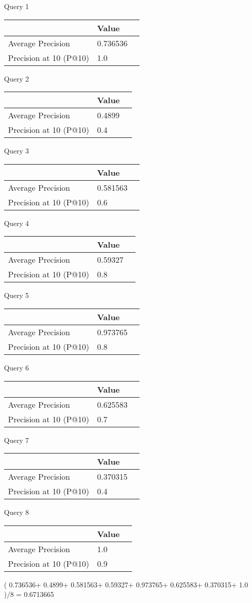 
Query 1
\begin{tabular}{lll}
\toprule
{} &     Value \\
\midrule
Average Precision &  0.736536 \\
Precision at 10 (P@10) &       1.0 \\
\bottomrule
\end{tabular}

Query 2
\begin{tabular}{lll}
\toprule
{} &   Value \\
\midrule
Average Precision &  0.4899 \\
Precision at 10 (P@10) &     0.4 \\
\bottomrule
\end{tabular}

Query 3
\begin{tabular}{lll}
\toprule
{} &     Value \\
\midrule
Average Precision &  0.581563 \\
Precision at 10 (P@10) &       0.6 \\
\bottomrule
\end{tabular}

Query 4
\begin{tabular}{lll}
\toprule
{} &    Value \\
\midrule
Average Precision &  0.59327 \\
Precision at 10 (P@10) &      0.8 \\
\bottomrule
\end{tabular}

Query 5
\begin{tabular}{lll}
\toprule
{} &     Value \\
\midrule
Average Precision &  0.973765 \\
Precision at 10 (P@10) &       0.8 \\
\bottomrule
\end{tabular}

Query 6
\begin{tabular}{lll}
\toprule
{} &     Value \\
\midrule
Average Precision &  0.625583 \\
Precision at 10 (P@10) &       0.7 \\
\bottomrule
\end{tabular}

Query 7
\begin{tabular}{lll}
\toprule
{} &     Value \\
\midrule
Average Precision &  0.370315 \\
Precision at 10 (P@10) &       0.4 \\
\bottomrule
\end{tabular}

Query 8
\begin{tabular}{lll}
\toprule
{} &  Value \\
\midrule
Average Precision &    1.0 \\
Precision at 10 (P@10) &    0.9 \\
\bottomrule
\end{tabular}

(  0.736536+
0.4899+
0.581563+
0.59327+
0.973765+
0.625583+
0.370315+
  1.0
  )/8 = 0.6713665